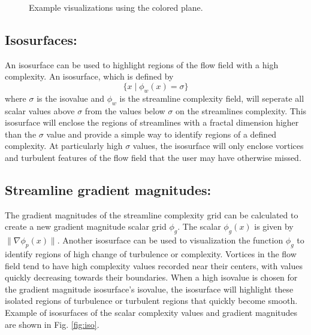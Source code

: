 \documentclass[journal]{vgtc}                %
\begin{document}
\begin{figure}[t]
	\centering
		\begin{minipage}{0.47\linewidth}
			\centering \small
		\end{minipage}
		\begin{minipage}{0.47\linewidth}
			\centering \small
		\end{minipage}
	\caption{Example visualizations using the colored plane.}
	\label{fig:plane}
\end{figure}

\subsection{Isosurfaces:} 
An isosurface can be used to highlight regions of the flow field with a high complexity.
An isosurface, which is defined by
\begin{equation} \{ x \mid \phi_w(x) = \sigma \}\end{equation}
where $\sigma$ is the isovalue and $\phi_w$ is the streamline complexity field, will seperate all scalar values above $\sigma$ from the values below $\sigma$ on the streamlines complexity.
This isosurface will enclose the regions of streamlines with a fractal dimension higher than the $\sigma$ value and provide a simple way to identify regions of a defined complexity.
At particularly high $\sigma$ values, the isosurface will only enclose vortices and turbulent features of the flow field that the user may have otherwise missed.

\subsection{Streamline gradient magnitudes:}
The gradient magnitudes of the streamline complexity grid can be calculated to create a new gradient magnitude scalar grid $\phi_g$.
The scalar $\phi_g(x)$ is given by $\| \nabla \phi_p(x) \|$.
Another isosurface can be used to visualization the function $\phi_g$ to identify regions of high change of turbulence or complexity.
Vortices in the flow field tend to have high complexity values recorded near their centers, with values quickly decreasing towards their boundaries.
When a high isovalue is chosen for the gradient magnitude isosurface's isovalue, the isosurface will highlight these isolated regions of turbulence or turbulent regions that quickly become smooth.
Example of isosurfaces of the scalar complexity values and gradient magnitudes are shown in Fig. \ref{fig:iso}.
\end{document}
